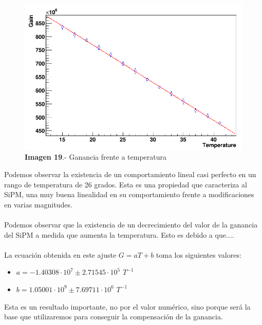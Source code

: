 \documentclass[11pt, a4paper]{article}
\begin{document}
\begin{itemize}
\begin{figure}[hbtp]
\centering
\includegraphics[scale=0.2]{Dependenciatemperatura.png}
\caption{\textbf{Imagen 19}.- Ganancia frente a temperatura}
\end{figure}

Podemos observar la existencia de un comportamiento lineal casi perfecto en un rango de temperatura de 26 grados. Esta es una propiedad que caracteriza al SiPM, una muy buena linealidad en su comportamiento frente a modificaciones en varias magnitudes.

\paragraph {}
Podemos observar que la existencia de un decrecimiento del valor de la ganancia del SiPM a medida que aumenta la temperatura. Esto es debido a que....

\paragraph {}
La ecuación obtenida en este ajuste $G=aT+b$ toma los siguientes valores: 
\begin{itemize}
\item{} $a=-1.40308 \cdot 10^7 \pm 2.71545 \cdot 10^5$ $T^{-1}$
\item{} $b=1.05001 \cdot 10^9 \pm 7.69711 \cdot 10^6$ $T^{-1}$
\end{itemize}

Esta es un resultado importante, no por el valor numérico, sino porque será la base que utilizaremos para conseguir la compensación de la ganancia.
\end{itemize}
\end{document}
